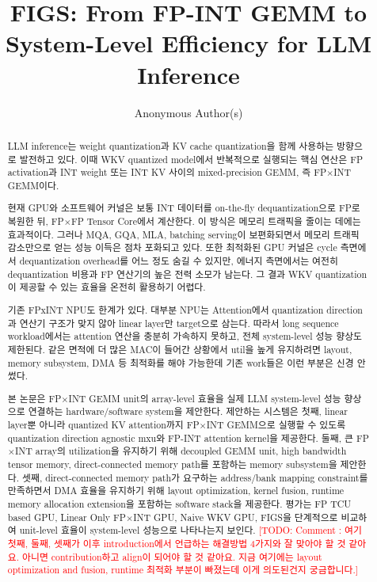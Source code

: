 \documentclass[11pt]{article}
\title{FIGS: From FP-INT GEMM to System-Level Efficiency for LLM Inference}
\author{Anonymous Author(s)}
\date{}
\newcommand{\todo}[1]{\textcolor{red}{[TODO: #1]}}
\newcommand{\fpint}{FP$\times$INT}
\newcommand{\wkv}{WKV}
\newcommand{\Cone}{FP TCU based GPU}
\newcommand{\Ctwo}{Linear Only FP$\times$INT GPU}
\newcommand{\Cthr}{Naive WKV GPU}
\newcommand{\Cfou}{FIGS}
\begin{document}
\maketitle
\begin{abstract}
LLM inference는 weight quantization과 KV cache quantization을 함께 사용하는 방향으로 발전하고 있다.
이때 \wkv{} quantized model에서 반복적으로 실행되는 핵심 연산은 FP activation과 INT weight 또는 INT KV 사이의 mixed-precision GEMM, 즉 \fpint{} GEMM이다.

현재 GPU와 소프트웨어 커널은 보통 INT 데이터를 on-the-fly dequantization으로 FP로 복원한 뒤, FP$\times$FP Tensor Core에서 계산한다.
이 방식은 메모리 트래픽을 줄이는 데에는 효과적이다.
그러나 MQA, GQA, MLA, batching serving이 보편화되면서 메모리 트래픽 감소만으로 얻는 성능 이득은 점차 포화되고 있다.
또한 최적화된 GPU 커널은 cycle 측면에서 dequantization overhead를 어느 정도 숨길 수 있지만, 에너지 측면에서는 여전히 dequantization 비용과 FP 연산기의 높은 전력 소모가 남는다.
그 결과 \wkv{} quantization이 제공할 수 있는 효율을 온전히 활용하기 어렵다.

기존 FPxINT NPU도 한계가 있다.
대부분 NPU는 Attention에서 quantization direction과 연산기 구조가 맞지 않아 linear layer만 target으로 삼는다.
따라서 long sequence workload에서는 attention 연산을 충분히 가속하지 못하고, 전체 system-level 성능 향상도 제한된다.
같은 면적에 더 많은 MAC이 들어간 상황에서 util을 높게 유지하려면 layout, memory subsystem, DMA 등 최적화를 해야 가능한데 기존 work들은 이런 부분은 신경 안 썼다.

본 논문은 \fpint{} GEMM unit의 array-level 효율을 실제 LLM system-level 성능 향상으로 연결하는 hardware/software system을 제안한다.
제안하는 시스템은 첫째, linear layer뿐 아니라 quantized KV attention까지 \fpint{} GEMM으로 실행할 수 있도록 quantization direction agnostic mxu와 FP-INT attention kernel을 제공한다.
둘째, 큰 \fpint{} array의 utilization을 유지하기 위해 decoupled GEMM unit, high bandwidth tensor memory, direct-connected memory path를 포함하는 memory subsystem을 제안한다.
셋째, direct-connected memory path가 요구하는 address/bank mapping constraint를 만족하면서 DMA 효율을 유지하기 위해 layout optimization, kernel fusion, runtime memory allocation extension을 포함하는 software stack을 제공한다.
평가는 \Cone{}, \Ctwo{}, \Cthr{}, \Cfou{}을 단계적으로 비교하여 unit-level 효율이 system-level 성능으로 나타나는지 보인다.
\todo{Comment : 여기 첫째, 둘째, 셋째가 이후 introduction에서 언급하는 해결방법 4가지와 잘 맞아야 할 것 같아요. 아니면 contribution하고 align이 되어야 할 것 같아요. 지금 여기에는 layout optimization and fusion, runtime 최적화 부분이 빠졌는데 이게 의도된건지 궁금합니다.}
\end{abstract}
\end{document}
